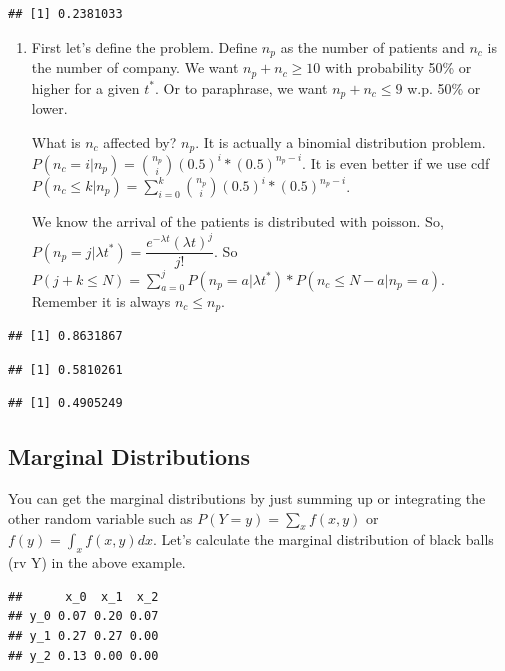 \documentclass[]{book}
\theoremstyle{definition}
\theoremstyle{definition}
\theoremstyle{definition}
\theoremstyle{remark}
\begin{document}
\begin{verbatim}
## [1] 0.2381033
\end{verbatim}

\begin{enumerate}
\def\labelenumi{\alph{enumi})}
\setcounter{enumi}{1}
\item
  First let's define the problem. Define \(n_p\) as the number of
  patients and \(n_c\) is the number of company. We want
  \(n_p + n_c \ge 10\) with probability 50\% or higher for a given
  \(t^*\). Or to paraphrase, we want \(n_p + n_c \le 9\) w.p. 50\% or
  lower.

  What is \(n_c\) affected by? \(n_p\). It is actually a binomial
  distribution problem.
  \(P(n_c = i|n_p) = \binom{n_p}{i} (0.5)^i*(0.5)^{n_p-i}\). It is even
  better if we use cdf
  \(P(n_c \le k|n_p) = \sum_{i=0}^{k} \binom{n_p}{i} (0.5)^i*(0.5)^{n_p-i}\).

  We know the arrival of the patients is distributed with poisson. So,
  \(P(n_p = j|\lambda t^*) = \dfrac{e^{-\lambda t}(\lambda t)^j}{j!}\).
  So
  \(P(j + k \le N) = \sum_{a=0}^j P(n_p = a|\lambda t^*)*P(n_c \le N-a | n_p = a)\).
  Remember it is always \(n_c \le n_p\).
\end{enumerate}

\begin{verbatim}
## [1] 0.8631867
\end{verbatim}

\begin{verbatim}
## [1] 0.5810261
\end{verbatim}

\begin{verbatim}
## [1] 0.4905249
\end{verbatim}

\hypertarget{marginal-distributions}{%
\subsection{Marginal Distributions}\label{marginal-distributions}}

You can get the marginal distributions by just summing up or integrating
the other random variable such as \(P(Y=y) = \sum_x f(x,y)\) or
\(f(y) = \int_x f(x,y) dx\). Let's calculate the marginal distribution
of black balls (rv Y) in the above example.

\begin{verbatim}
##      x_0  x_1  x_2
## y_0 0.07 0.20 0.07
## y_1 0.27 0.27 0.00
## y_2 0.13 0.00 0.00
\end{verbatim}
\end{document}
